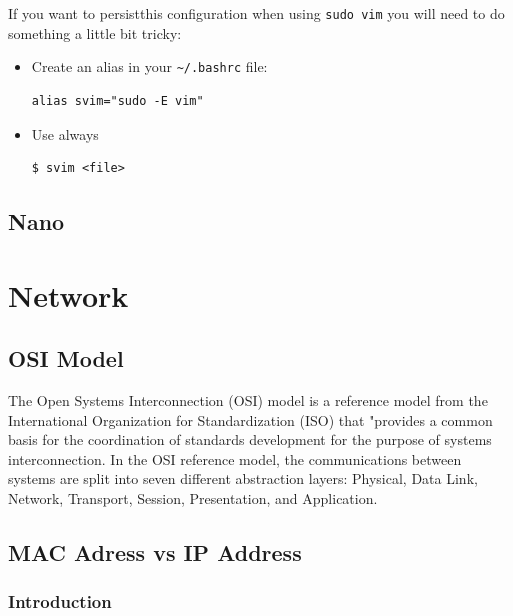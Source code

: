 \documentclass{article}
\newenvironment{codetemplate}[1][]{%
  \mybasecolorbox[#1]
  \itshape
}{%
  \endmybasecolorbox
}
\begin{document}
If you want to persistthis configuration when using \verb|sudo vim| you will need to do something a little bit tricky:

\begin{itemize}
    \item Create an alias in your \verb|~/.bashrc| file:
\begin{codetemplate}{}
\begin{verbatim}
alias svim="sudo -E vim"
\end{verbatim}
\end{codetemplate}

    \item Use always
\begin{codetemplate}{}
\begin{verbatim}
$ svim <file>
\end{verbatim}
\end{codetemplate}
\end{itemize}

\subsection{Nano}

\newpage
\section{Network}

\subsection{OSI Model}

The Open Systems Interconnection (OSI) model is a reference model from the International Organization for Standardization (ISO) that "provides a common basis for the coordination of standards development for the purpose of systems interconnection. In the OSI reference model, the communications between systems are split into seven different abstraction layers: Physical, Data Link, Network, Transport, Session, Presentation, and Application.

\subsection{MAC Adress vs IP Address}

\subsubsection{Introduction}
\end{document}
